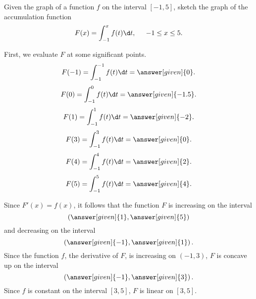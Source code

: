 \documentclass{ximera}
\begin{document}
\begin {example}
Given the graph of a function $f$ on the interval $[-1,5]$, sketch the graph of the accumulation function 
 \[
F(x) = \int_{-1}^x f(t) \d t, \hspace{0.2in}   -1\le x\le 5.
\]
\begin{image}
\end{image}
\begin{explanation}
First, we evaluate $F$ at some significant points.
\[
F(-1) = \int_{-1}^{-1} f(t) \d t=\answer[given]{0}.
\]
\[
F(0) = \int_{-1}^{0} f(t) \d t=\answer[given]{-1.5}.
\]
\[
F(1) = \int_{-1}^{1} f(t) \d t=\answer[given]{-2}.
\]
\[
F(3) = \int_{-1}^{3} f(t) \d t=\answer[given]{0}.
\]
\[
F(4) = \int_{-1}^{4} f(t) \d t=\answer[given]{2}.
\]
\[
F(5) = \int_{-1}^{5} f(t) \d t=\answer[given]{4}.
\]

Since $F'(x)=f(x)$, it follows that the function $F$ is increasing on the interval
\[
\left(\answer[given]{1},\answer[given]{5}\right)
\]
and decreasing on the interval
\[
\left(\answer[given]{-1},\answer[given]{1}\right).
\]
Since the function $f$, the derivative of $F$, is increasing on $(-1,3)$,  $F$ is concave up on the interval
\[
\left(\answer[given]{-1},\answer[given]{3}\right).
\]
Since $f$ is constant on the interval  $[3,5]$, $F$ is linear on $[3,5]$. 


\end{explanation}
\end{example}
\end{document}
